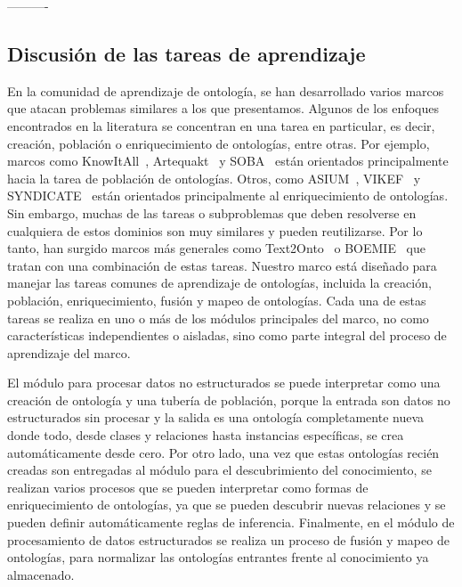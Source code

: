 ----------
\subsection{Discusión de las tareas de aprendizaje}

En la comunidad de aprendizaje de ontología, se han desarrollado varios marcos que atacan problemas similares a los que presentamos.
Algunos de los enfoques encontrados en la literatura se concentran en una tarea en particular, es decir, creación, población o enriquecimiento de ontologías, entre otras.
Por ejemplo, marcos como KnowItAll~\cite{knowitall}, Artequakt~\cite{artequakt} y SOBA~\cite{soba} están orientados principalmente hacia la tarea de población de ontologías.
Otros, como ASIUM~\cite{asium}, VIKEF~\cite{vikef} y SYNDICATE~\cite{syndikate} están orientados principalmente al enriquecimiento de ontologías.
Sin embargo, muchas de las tareas o subproblemas que deben resolverse en cualquiera de estos dominios son muy similares y pueden reutilizarse.
Por lo tanto, han surgido marcos más generales como Text2Onto~\cite{cimiano2005text2onto} o BOEMIE~\cite{boemie} que tratan con una combinación de estas tareas.
Nuestro marco está diseñado para manejar las tareas comunes de aprendizaje de ontologías, incluida la creación, población, enriquecimiento, fusión y mapeo de ontologías.
Cada una de estas tareas se realiza en uno o más de los módulos principales del marco, no como características independientes o aisladas, sino como parte integral del proceso de aprendizaje del marco.

El módulo para procesar datos no estructurados se puede interpretar como una creación de ontología y una tubería de población, porque la entrada son datos no estructurados sin procesar y la salida es una ontología completamente nueva donde todo, desde clases y relaciones hasta instancias específicas, se crea automáticamente desde cero.
Por otro lado, una vez que estas ontologías recién creadas son entregadas al módulo para el descubrimiento del conocimiento, se realizan varios procesos que se pueden interpretar como formas de enriquecimiento de ontologías, ya que se pueden descubrir nuevas relaciones y se pueden definir automáticamente reglas de inferencia.
Finalmente, en el módulo de procesamiento de datos estructurados se realiza un proceso de fusión y mapeo de ontologías, para normalizar las ontologías entrantes frente al conocimiento ya almacenado.

